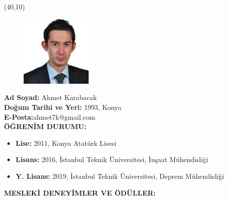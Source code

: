 \vspace{10mm}

\noindent \newsavebox{\mysquare}
\savebox{\mysquare}{\textcolor{black}{\rule[2.3pt]{3.4pt}{3.4pt}}}

\setlength{\TPHorizModule}{10pt}
\setlength{\TPVertModule}{10pt}

\begin{textblock}{1}(40,10)
 	\begin{figure}[p]
		\includegraphics[width=3.5cm,keepaspectratio=true]{./fig/CV.jpg}
	\end{figure}
\end{textblock}

\noindent \textbf{Ad Soyad:} Ahmet Karabacak \\

\vspace{-3mm}
 \textbf{Doğum Tarihi ve Yeri:} 1993, Konya \\

\vspace{-3mm}
 \textbf{E-Posta:}ahmet7k@gmail.com \\

\textbf{ÖĞRENİM DURUMU:} \vspace{-3mm}

\begin{itemize}
\item \textbf{Lise:} 2011, Konya Atatürk Lisesi 
\item \textbf{Lisans:} 2016, İstanbul Teknik Üniversitesi, İnşaat Mühendisliği 
\item \textbf{Y. Lisans:} 2019, İstanbul Teknik Üniversitesi, Deprem Mühendisliği
\end{itemize}
\textbf{MESLEKİ DENEYİMLER VE ÖDÜLLER:} \vspace{-3mm}

